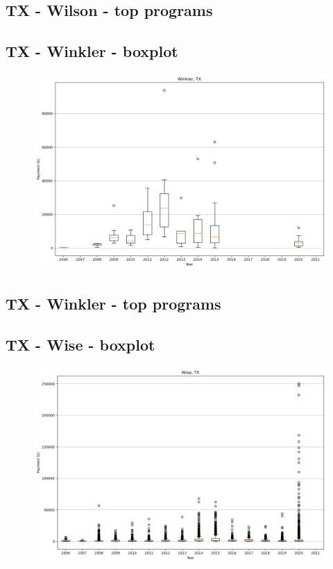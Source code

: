 \subsection*{TX - Wilson - top programs}

\newpage
\subsection*{TX - Winkler - boxplot}
\begin{figure}[h]
\centering
\includegraphics[width=7in]{../output/boxplots/counties/Winkler-TX_boxplot.png}
\end{figure}


\subsection*{TX - Winkler - top programs}

\newpage
\subsection*{TX - Wise - boxplot}
\begin{figure}[h]
\centering
\includegraphics[width=7in]{../output/boxplots/counties/Wise-TX_boxplot.png}
\end{figure}


